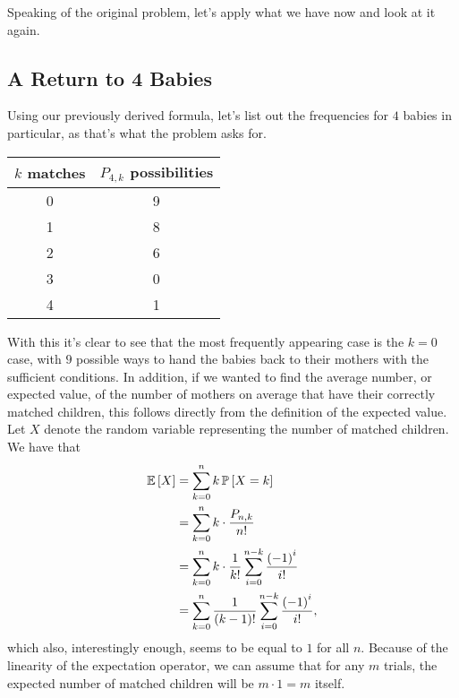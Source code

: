 Speaking of the original problem, let's apply what we have now and look at it
again.

\subsection{A Return to 4 Babies}

Using our previously derived formula, let's list out the frequencies for \( 4
\) babies in particular, as that's what the problem asks for.
\begin{center}
    \begin{tabular}{c|c}
        \( k \) matches & \( P_{4,k} \) possibilities \\
        \hline
        0 & 9 \\
        1 & 8 \\
        2 & 6 \\
        3 & 0 \\
        4 & 1
    \end{tabular}
\end{center}
With this it's clear to see that the most frequently appearing case is the \( k
= 0 \) case, with \( 9 \) possible ways  to hand the babies back to their mothers with the
sufficient conditions. In addition, if we wanted to find the average number, or
expected value, of the number of mothers on average that have their correctly
matched children, this follows directly from the definition of the expected
value. Let \( X \) denote the random variable representing the number of
matched children. We have that
\begin{align*}
    \operatorname{\mathbb{E}} \left[ X \right] &= \sum_{k = 0}^{n} k\operatorname{\mathbb{P}} \left[ X = k \right] \\
    &= \sum_{k = 0}^{n} k \cdot \frac{P_{n, k}}{n!} \\
    &= \sum_{k = 0}^{n} k \cdot \frac{1}{k!} \sum_{i = 0}^{n - k} \frac{\left( -1 \right)^i}{i!} \\
    &= \sum_{k = 0}^{n} \frac{1}{\left( k - 1 \right)!} \sum_{i = 0}^{n - k} \frac{\left( -1 \right)^i}{i!}
,\end{align*}
which also, interestingly enough, seems to be equal to \( 1 \) for all \( n \).
Because of the linearity of the expectation operator, we can assume that for
any \( m \) trials, the expected number of matched children will be \( m \cdot
1 = m \) itself.

